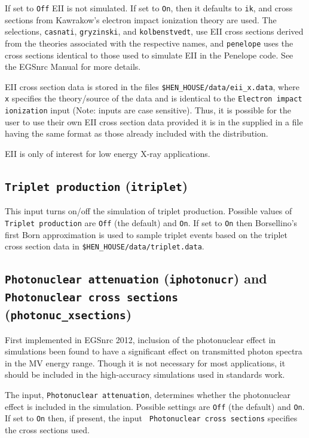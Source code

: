 \documentclass[12pt,twoside]{article}
\begin{document}
If set to {\tt Off} EII is not simulated. If set to {\tt On}, then it defaults
to {\tt ik}, and cross sections from Kawrakow's electron impact ionization
theory\cite{Ka02b} are used.  The selections, {\tt casnati}, {\tt gryzinski},
and {\tt kolbenstvedt}, use EII cross sections derived from the theories
associated with the respective names, and {\tt penelope} uses the cross sections
identical to those used to simulate EII in the Penelope code. See the EGSnrc
Manual\cite{KR03} for more details.

EII cross section data is stored in the files \verb+$HEN_HOUSE/data/eii_x.data+,
where \verb+x+ specifies the theory/source of the data and is identical to the
{\tt Electron impact ionization} input (Note: inputs are case sensitive).  Thus,
it is possible for the user to use their own EII cross section data provided it
is in the supplied in a file having the same format as those already included
with the distribution.

EII is only of interest for low energy X-ray applications.

\subsection{ {\tt Triplet production} ({\tt itriplet})}

This input turns on/off the simulation of triplet production. Possible values of
{\tt Triplet production} are {\tt Off} (the default) and {\tt On}.  If set to
{\tt On} then Borsellino's first Born approximation\cite{Mo69} is used to sample
triplet events based on the triplet cross section data in
\verb+$HEN_HOUSE/data/triplet.data+.

\subsection{ {\tt Photonuclear attenuation} ({\tt iphotonucr}) and\\
{\tt Photonuclear cross sections} ({\tt photonuc\_xsections})}

First implemented in EGSnrc 2012\cite{AR12}, inclusion of the photonuclear
effect in simulations been found to have a significant effect on transmitted
photon spectra in the MV energy range.  Though it is not necessary for most
applications, it should be included in the high-accuracy simulations used in
standards work.

The input, {\tt Photonuclear attenuation}, determines whether the photonuclear
effect is included in the simulation.  Possible settings are {\tt Off} (the
default) and {\tt On}.  If set to {\tt On} then, if present, the input {\tt
Photonuclear cross sections} specifies the cross sections used.
\end{document}
